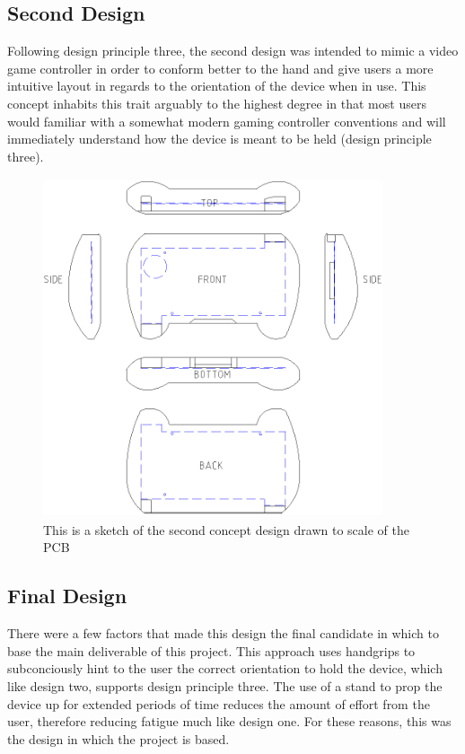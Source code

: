 \subsection{Second Design}

Following design principle three, the second design was intended to mimic a video game controller in order to conform better to the hand and give users a more intuitive layout in regards to the orientation of the device when in use. 
This concept inhabits this trait arguably to the highest degree in that most users would familiar with a somewhat modern gaming controller conventions and will immediately understand how the device is meant to be held (design principle three).

\begin{figure}[hbt!]
\centering
\includegraphics[width=10cm,height=10cm,keepaspectratio]{Figures/design2_sketch.png}
\caption{This is a sketch of the second concept design drawn to scale of the PCB}
\label{fig:Design_2}
\end{figure}

\subsection{Final Design}

There were a few factors that made this design the final candidate in which to base the main deliverable of this project.
This approach uses handgrips to subconciously hint to the user the correct orientation to hold the device, which like design two, supports design principle three.
The use of a stand to prop the device up for extended periods of time reduces the amount of effort from the user, therefore reducing fatigue much like design one.
For these reasons, this was the design in which the project is based.

